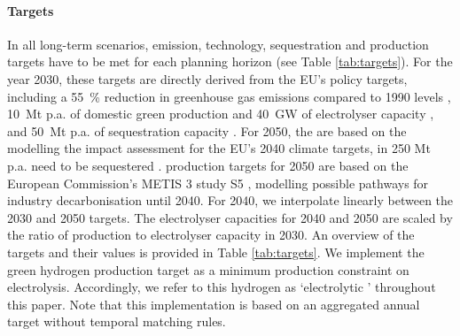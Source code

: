 \documentclass[final,5p,times,twocolumn,sort&compress]{elsarticle}
\begin{document}
\paragraph{Targets}
\label{sec:targets}
In all long-term scenarios, emission, technology, sequestration and production targets have to be met for each planning horizon (see Table \ref{tab:targets}). For the year 2030, these targets are directly derived from the EU's policy targets, including a \SI{55}{\percent} reduction in greenhouse gas emissions compared to 1990 levels \cite{europeancommissionFit55Delivering2021}, \SI{10}{Mt} p.a. of domestic green  production \cite{europeancommissionREPowerEUPlanCommunication2022} and \SI{40}{GW} of electrolyser capacity \cite{europeancommissionCommunicationCommissionEuropean2020}, and \SI{50}{Mt} p.a. of  sequestration capacity \cite{europeanparliamentRegulationEU20242024}. For 2050, the  are based on the modelling the impact assessment for the EU's 2040 climate targets, in 250 Mt p.a. need to be sequestered \cite{europeancommissionCommunicationCommissionEuropean2024}.  production targets for 2050 are based on the European Commission's METIS 3 study S5 \cite{europeancommission.directorategeneralforenergy.METIS3Study2023}, modelling possible pathways for industry decarbonisation until 2040. For 2040, we interpolate linearly between the 2030 and 2050 targets. The electrolyser capacities for 2040 and 2050 are scaled by the ratio of  production to electrolyser capacity in 2030. An overview of the targets and their values is provided in Table \ref{tab:targets}. We implement the green hydrogen production target as a minimum production constraint on electrolysis. Accordingly, we refer to this hydrogen as `electrolytic ' throughout this paper. Note that this implementation is based on an aggregated annual target without temporal matching rules.
\end{document}
